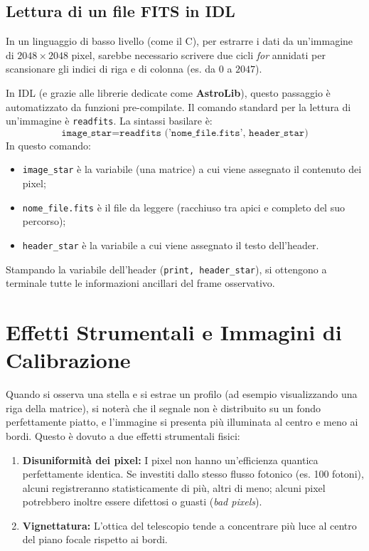 \subsection{Lettura di un file FITS in IDL}

In un linguaggio di basso livello (come il C), per estrarre i dati da un'immagine di $2048 \times 2048$ pixel, sarebbe necessario scrivere due cicli \textit{for} annidati per scansionare gli indici di riga e di colonna (es. da $0$ a $2047$).

In IDL (e grazie alle librerie dedicate come \textbf{AstroLib}), questo passaggio è automatizzato da funzioni pre-compilate. Il comando standard per la lettura di un'immagine è \texttt{readfits}.
La sintassi basilare è:
\begin{equation}
\texttt{image\_star} = \texttt{readfits ('nome\_file.fits', header\_star)}
\end{equation}
In questo comando:
\begin{itemize}
\item \texttt{image\_star} è la variabile (una matrice) a cui viene assegnato il contenuto dei pixel;
\item \texttt{nome\_file.fits} è il file da leggere (racchiuso tra apici e completo del suo percorso);
\item \texttt{header\_star} è la variabile a cui viene assegnato il testo dell'header.
\end{itemize}
Stampando la variabile dell'header (\texttt{print, header\_star}), si ottengono a terminale tutte le informazioni ancillari del frame osservativo.

\section{Effetti Strumentali e Immagini di Calibrazione}

Quando si osserva una stella e si estrae un profilo (ad esempio visualizzando una riga della matrice), si noterà che il segnale non è distribuito su un fondo perfettamente piatto, e l'immagine si presenta più illuminata al centro e meno ai bordi.
Questo è dovuto a due effetti strumentali fisici:
\begin{enumerate}
\item \textbf{Disuniformità dei pixel:} I pixel non hanno un'efficienza quantica perfettamente identica. Se investiti dallo stesso flusso fotonico (es. 100 fotoni), alcuni registreranno statisticamente di più, altri di meno; alcuni pixel potrebbero inoltre essere difettosi o guasti (\textit{bad pixels}).
\item \textbf{Vignettatura:} L'ottica del telescopio tende a concentrare più luce al centro del piano focale rispetto ai bordi.
\end{enumerate}

